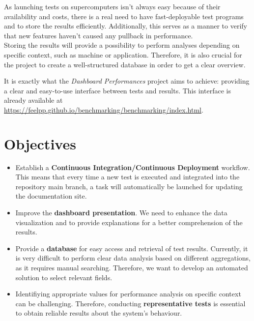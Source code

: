 \documentclass[12pt]{article}
\begin{document}
\newpage
As launching tests on supercomputers isn't always easy because of their availability and costs, there is a real need to have fast-deployable test programs and to store the results efficiently.
Additionally, this serves as a manner to verify that new features haven't caused any pullback in performance. \\
Storing the results will provide a possibility to perform analyses depending on specific context, such as machine or application.
Therefore, it is also crucial for the project to create a well-structured database in order to get a clear overview.

It is exactly what the \textit{Dashboard Performances} project aims to achieve: providing a clear and easy-to-use interface between tests and results.
This interface is already available at \url{https://feelpp.github.io/benchmarking/benchmarking/index.html}.

\vspace{1cm}
\section{Objectives}
\begin{itemize}
    \item Establish a \textbf{Continuous Integration/Continuous Deployment} workflow.
    This means that every time a new test is executed and integrated into the repository main branch, a task will automatically be launched for updating the documentation site. \\
    \item Improve the \textbf{dashboard presentation}. We need to enhance the data visualization and to provide explanations for a better comprehension of the results. \\
    \item Provide a \textbf{database} for easy access and retrieval of test results.
    Currently, it is very difficult to perform clear data analysis based on different aggregations, as it requires manual searching.
    Therefore, we want to develop an automated solution to select relevant fields.
    \item Identifiying appropriate values for performance analysis on specific context can be challenging. Therefore, conducting \textbf{representative tests} is essential to obtain reliable results about the system's behaviour. \\


\end{itemize}
\end{document}
